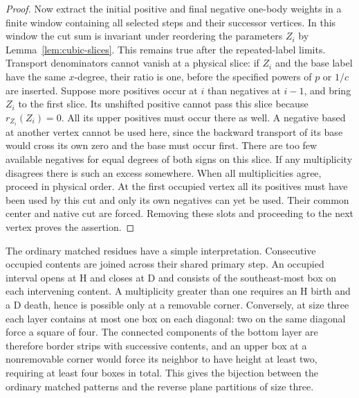 \begin{proof}
Now extract the initial positive and final negative one-body weights
in a finite window containing all selected steps and their successor
vertices. In this window the cut sum is invariant under reordering
the parameters $Z_i$ by Lemma~\ref{lem:cubic-slices}. This remains
true after the repeated-label limits. Transport denominators cannot
vanish at a physical slice: if $Z_i$ and the base label have the
same $x$-degree, their ratio is one, before the specified powers of
$p$ or $1/c$ are inserted. Suppose more positives occur at $i$ than
negatives at $i-1$, and bring $Z_i$ to the first slice. Its unshifted
positive cannot pass this slice because $r_{Z_i}(Z_i)=0$. All its
upper positives must occur there as well. A negative based at another
vertex cannot be used here, since the backward transport of its base
would cross its own zero and the base must occur first. There are too
few available negatives for equal degrees of both signs on this slice.
If any multiplicity disagrees there is such an excess somewhere.
When all multiplicities agree, proceed in physical order. At the first
occupied vertex all its positives must have been used by this cut
and only its own negatives can yet be used. Their common center and
native cut are forced. Removing these slots and proceeding to the
next vertex proves the assertion.
\end{proof}

The ordinary matched residues have a simple interpretation. Consecutive
occupied contents are joined across their shared primary step. An
occupied interval opens at H and closes at D and consists of the
southeast-most box on each intervening content. A multiplicity greater
than one requires an H birth and a D death, hence is possible only at
a removable corner. Conversely, at size three each layer contains
at most one box on each diagonal: two on the same diagonal force a
square of four. The connected components of the bottom layer are
therefore border strips with successive contents, and an upper box
at a nonremovable corner would force its neighbor to have height
at least two, requiring at least four boxes in total. This gives the bijection between
the ordinary matched patterns and the reverse plane partitions of
size three.

